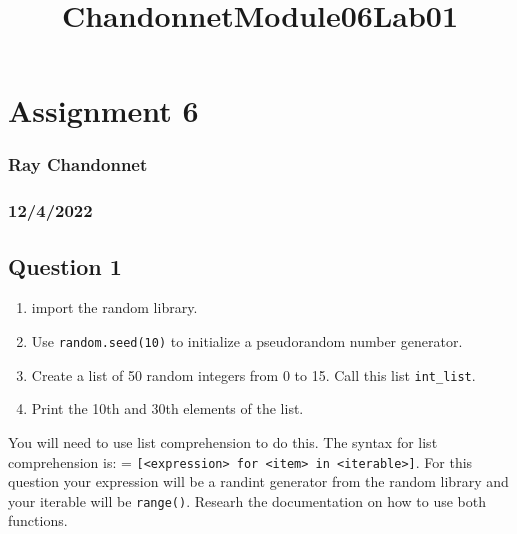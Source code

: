 \documentclass[11pt]{article}
\title{ChandonnetModule06Lab01}
\begin{document}
    
    \maketitle
    
    

    
    \hypertarget{assignment-6}{%
\section{Assignment 6}\label{assignment-6}}

\hypertarget{ray-chandonnet}{%
\subsubsection{Ray Chandonnet}\label{ray-chandonnet}}

\hypertarget{section}{%
\subsubsection{12/4/2022}\label{section}}

    \hypertarget{question-1}{%
\subsection{Question 1}\label{question-1}}

\begin{enumerate}
\def\labelenumi{\arabic{enumi})}
\item
  import the random library.
\item
  Use \texttt{random.seed(10)} to initialize a pseudorandom number
  generator.
\item
  Create a list of 50 random integers from 0 to 15. Call this list
  \texttt{int\_list}.
\item
  Print the 10th and 30th elements of the list.
\end{enumerate}

You will need to use list comprehension to do this. The syntax for list
comprehension is: =
\texttt{{[}\textless{}expression\textgreater{}\ for\ \textless{}item\textgreater{}\ in\ \textless{}iterable\textgreater{}{]}}.
For this question your expression will be a randint generator from the
random library and your iterable will be \texttt{range()}. Researh the
documentation on how to use both functions.
\end{document}
